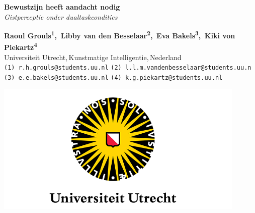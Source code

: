 \documentclass[a0,portrait]{a0poster}
\begin{document}


\begin{minipage}[b]{0.4\linewidth}
\Huge \color{NavyBlue} \textbf{Bewustzijn heeft aandacht nodig}\\ \color{Black} %
\Large\textit{Gistperceptie onder dualtaskcondities}\\ %
\end{minipage}
\begin{minipage}{0.4\linewidth}
\normalsize \textbf{Raoul Grouls\textsuperscript{1},
	\,Libby van den Besselaar\textsuperscript{2},
	\,Eva Bakels\textsuperscript{3},
	\,Kiki von Piekartz\textsuperscript{4}}\\ %
\small Universiteit Utrecht,\,Kunstmatige Intelligentie,\,Nederland \\%
\small \texttt{(1) r.h.grouls@students.uu.nl}
\texttt{(2) l.l.m.vandenbesselaar@students.uu.n}\\
\texttt{(3) e.e.bakels@students.uu.nl}
\texttt{(4) k.g.piekartz@students.uu.nl}
\end{minipage}
\begin{minipage}[b]{0.2\linewidth}
\includegraphics[width=12cm]{uu-logo.png} 
\end{minipage}
\vspace{2cm} %
\end{document}
